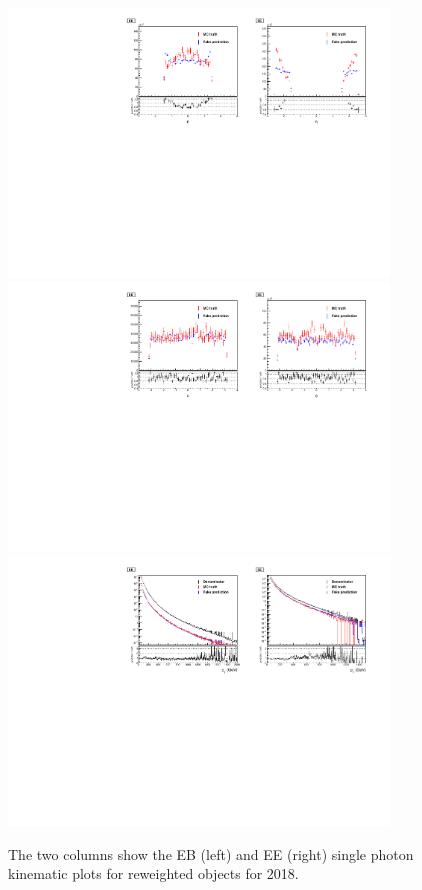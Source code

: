 \begin{figure}[!htbp]
\caption{The two columns show the EB (left) and EE (right) single photon kinematic plots for reweighted objects for 2018.}
\centering
\includegraphics[width=0.9\textwidth]{fig/closure_test_photon_kinematics_eta_2018sans_Denom.pdf}\\
\includegraphics[width=0.9\textwidth]{fig/closure_test_photon_kinematics_phi_2018sans_Denom.pdf} \\
\includegraphics[width=0.9\textwidth]{fig/closure_test_photon_kinematics_pt_2018.pdf}

\end{figure}
